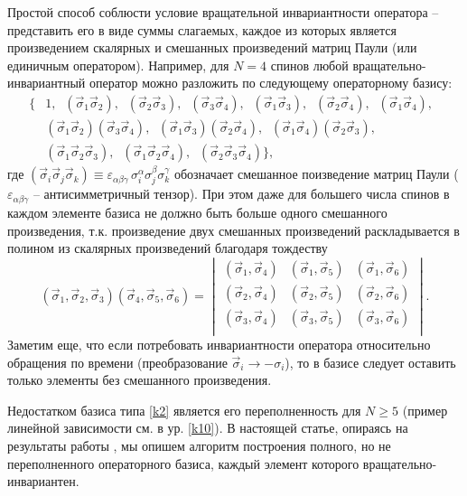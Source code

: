 \documentclass[]{article}
\renewcommand{\[}{\begin{equation}}
\renewcommand{\]}{\end{equation}}
\begin{document}
Простой способ соблюсти условие вращательной инвариантности оператора -- представить его в виде суммы слагаемых, каждое из которых является произведением скалярных и смешанных произведений матриц Паули (или единичным оператором). Например, для $N=4$ спинов любой вращательно-инвариантный оператор можно разложить по следующему операторному базису:
\begin{align}
\{ & 1,  \;\;
({\vec \sigma}_1{\vec\sigma}_2), \;\; 
({\vec \sigma}_2{\vec\sigma}_3), \;\;
({\vec \sigma}_3{\vec\sigma}_4), \;\;
({\vec \sigma}_1{\vec\sigma}_3), \;\;
({\vec \sigma}_2{\vec\sigma}_4), \;\;
({\vec \sigma}_1{\vec\sigma}_4), \;\;
\nonumber\\
&({\vec \sigma}_1{\vec\sigma}_2)({\vec \sigma}_3{\vec\sigma}_4),\;\;({\vec \sigma}_1{\vec\sigma}_3)({\vec \sigma}_2{\vec\sigma}_4),\;\;
({\vec \sigma}_1{\vec\sigma}_4)({\vec \sigma}_2{\vec\sigma}_3),\;\; \nonumber \\
&({\vec \sigma}_1{\vec\sigma}_2{\vec\sigma}_3),\;\;({\vec \sigma}_1{\vec\sigma}_2{\vec\sigma}_4),\;\;({\vec \sigma}_2{\vec\sigma}_3{\vec\sigma}_4)
\},
\label{k2}
\end{align}
где $({\vec \sigma}_i{\vec\sigma}_j{\vec\sigma}_k)\equiv \varepsilon_{\alpha \beta \gamma} \, \sigma_i^\alpha \sigma_j^\beta \sigma_k^\gamma$ обозначает смешанное поизведение матриц Паули ($ \varepsilon_{\alpha \beta \gamma}$  -- антисимметричный тензор). 
При этом даже для большего числа спинов в каждом элементе базиса не должно быть больше одного смешанного произведения, т.к. произведение двух смешанных произведений раскладывается в полином из скалярных произведений благодаря тождеству
\[
(\vec\sigma_1,\vec\sigma_2,\vec\sigma_3)
(\vec\sigma_4,\vec\sigma_5,\vec\sigma_6)=
\begin{vmatrix}
	(\vec\sigma_1,\vec\sigma_4) & 	(\vec\sigma_1,\vec\sigma_5) & (\vec\sigma_1,\vec\sigma_6) \\
	(\vec\sigma_2,\vec\sigma_4) & 	(\vec\sigma_2,\vec\sigma_5) & (\vec\sigma_2,\vec\sigma_6) \\
	(\vec\sigma_3,\vec\sigma_4) & 	(\vec\sigma_3,\vec\sigma_5) & (\vec\sigma_3,\vec\sigma_6) \\
\end{vmatrix}.
\label{k3}
\]
Заметим еще, что если потребовать инвариантности оператора относительно обращения по времени (преобразование $\vec\sigma_i\rightarrow -\sigma_i$), то в базисе следует оставить только элементы без смешанного произведения.


Недостатком базиса типа \eqref{k2} является его переполненность для $N\geq 5$ \cite{variational}(пример линейной зависимости см. в ур. \eqref{k10}).
В настоящей статье, опираясь на результаты работы \cite{sourceArticle}, мы опишем алгоритм построения полного, но не переполненного операторного базиса, каждый элемент которого вращательно-инвариантен.
\end{document}
